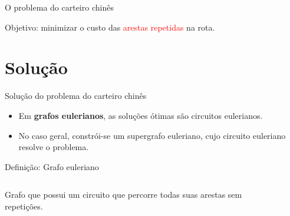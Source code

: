 \documentclass{beamer}
\begin{document}
\begin{frame}{O problema do carteiro chinês}
    \begin{center}
        Objetivo: minimizar o custo das \textcolor{red}{arestas repetidas} na rota.
    \end{center}
\end{frame}

\section{Solução}

\begin{frame}{Solução do problema do carteiro chinês}
    \begin{itemize}
        \item Em \textbf{grafos eulerianos}, as soluções ótimas são circuitos eulerianos.
        \item No caso geral, constrói-se um supergrafo euleriano, cujo circuito euleriano resolve o problema.
    \end{itemize}

    \vspace{10px}

    \begin{alertblock}{Definição: Grafo euleriano}

        \begin{columns}
            Grafo que possui um circuito que percorre todas suas arestas sem repetições. 

            \begin{figure}
                \centering
            \end{figure}
            \vspace{3px}
        \end{columns}
    \end{alertblock}

\end{frame}
\end{document}
